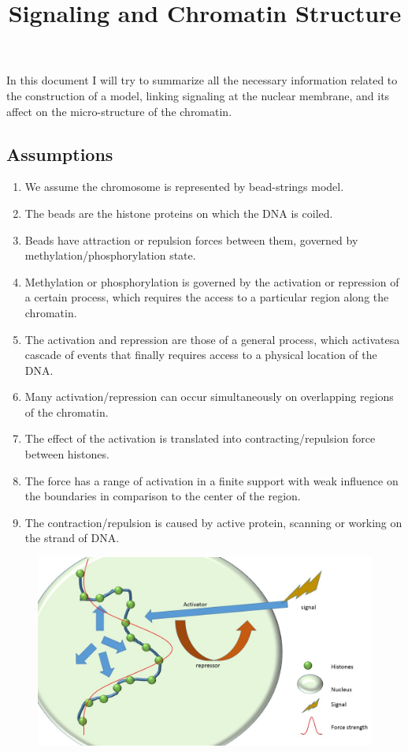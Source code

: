 \documentclass[12pt]{paper}
\begin{document}
\title{Signaling and Chromatin Structure}
\maketitle

In this document I will try to summarize all the necessary information related to the construction of a model, linking signaling at the nuclear membrane, and its affect on the micro-structure of the chromatin.

\subsection{Assumptions}
\begin{enumerate}
\item We assume the chromosome is represented by bead-strings model. 
\item The beads are the histone proteins on which the DNA is coiled.
\item Beads have attraction or repulsion forces between them, governed by methylation/phosphorylation state.
\item Methylation or phosphorylation is governed by the activation or repression of a certain process, which requires the access to a particular region along the chromatin. 
\item The activation and repression are those of a general process, which activatesa cascade of events that finally requires access to a physical location of the DNA. 
\item Many activation/repression can occur simultaneously on overlapping regions of the chromatin. 
\item The effect of the activation is translated into contracting/repulsion force between histones.
\item The force has a range of activation in a finite support with weak influence on the boundaries in comparison to the center of the region.
\item The contraction/repulsion is caused by active protein, scanning or working on the strand of DNA.

\end{enumerate}

\begin{figure}[h!]
\includegraphics[scale=0.4]{modelSketch}
\end{figure}
\end{document}
